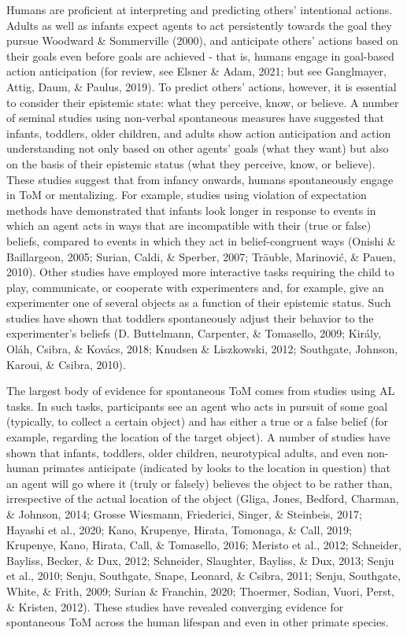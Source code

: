 \documentclass[
  english,
  man,floatsintext]{apa6}
\begin{document}
Humans are proficient at interpreting and predicting others' intentional actions. Adults as well as infants expect agents to act persistently towards the goal they pursue Woodward \& Sommerville (2000), and anticipate others' actions based on their goals even before goals are achieved - that is, humans engage in goal-based action anticipation (for review, see Elsner \& Adam, 2021; but see Ganglmayer, Attig, Daum, \& Paulus, 2019). To predict others' actions, however, it is essential to consider their epistemic state: what they perceive, know, or believe. A number of seminal studies using non-verbal spontaneous measures have suggested that infants, toddlers, older children, and adults show action anticipation and action understanding not only based on other agents' goals (what they want) but also on the basis of their epistemic status (what they perceive, know, or believe). These studies suggest that from infancy onwards, humans spontaneously engage in ToM or mentalizing. For example, studies using violation of expectation methods have demonstrated that infants look longer in response to events in which an agent acts in ways that are incompatible with their (true or false) beliefs, compared to events in which they act in belief-congruent ways (Onishi \& Baillargeon, 2005; Surian, Caldi, \& Sperber, 2007; Träuble, Marinović, \& Pauen, 2010). Other studies have employed more interactive tasks requiring the child to play, communicate, or cooperate with experimenters and, for example, give an experimenter one of several objects as a function of their epistemic status. Such studies have shown that toddlers spontaneously adjust their behavior to the experimenter's beliefs (D. Buttelmann, Carpenter, \& Tomasello, 2009; Király, Oláh, Csibra, \& Kovács, 2018; Knudsen \& Liszkowski, 2012; Southgate, Johnson, Karoui, \& Csibra, 2010).

The largest body of evidence for spontaneous ToM comes from studies using AL tasks. In such tasks, participants see an agent who acts in pursuit of some goal (typically, to collect a certain object) and has either a true or a false belief (for example, regarding the location of the target object). A number of studies have shown that infants, toddlers, older children, neurotypical adults, and even non-human primates anticipate (indicated by looks to the location in question) that an agent will go where it (truly or falsely) believes the object to be rather than, irrespective of the actual location of the object (Gliga, Jones, Bedford, Charman, \& Johnson, 2014; Grosse Wiesmann, Friederici, Singer, \& Steinbeis, 2017; Hayashi et al., 2020; Kano, Krupenye, Hirata, Tomonaga, \& Call, 2019; Krupenye, Kano, Hirata, Call, \& Tomasello, 2016; Meristo et al., 2012; Schneider, Bayliss, Becker, \& Dux, 2012; Schneider, Slaughter, Bayliss, \& Dux, 2013; Senju et al., 2010; Senju, Southgate, Snape, Leonard, \& Csibra, 2011; Senju, Southgate, White, \& Frith, 2009; Surian \& Franchin, 2020; Thoermer, Sodian, Vuori, Perst, \& Kristen, 2012). These studies have revealed converging evidence for spontaneous ToM across the human lifespan and even in other primate species.
\end{document}
